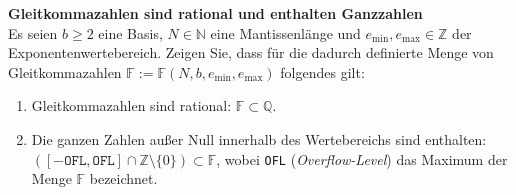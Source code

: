 \textbf{Gleitkommazahlen sind rational und enthalten Ganzzahlen}\\
 Es seien $b\geq 2$ eine Basis, $N\in \mathbb{N}$ eine Mantissenlänge und $e_{\text{min}}, e_{\text{max}} \in \mathbb{Z}$ der Exponentenwertebereich. Zeigen Sie, dass für die dadurch definierte Menge von Gleitkommazahlen $\mathbb{F} := \mathbb{F}(N,b,e_{\text{min}}, e_{\text{max}})$ folgendes gilt:
 \begin{enumerate}
 	\item Gleitkommazahlen sind rational: $\mathbb{F} \subset \mathbb{Q}$.
 	\item Die ganzen Zahlen außer Null innerhalb des Wertebereichs sind enthalten: $\left([-\texttt{OFL}, \texttt{OFL}] \cap \mathbb{Z}\setminus\{0\}\right)\subset \mathbb{F}$, wobei \texttt{OFL}  (\textit{Overflow-Level}) das Maximum der Menge $\mathbb{F}$ bezeichnet.
 \end{enumerate}